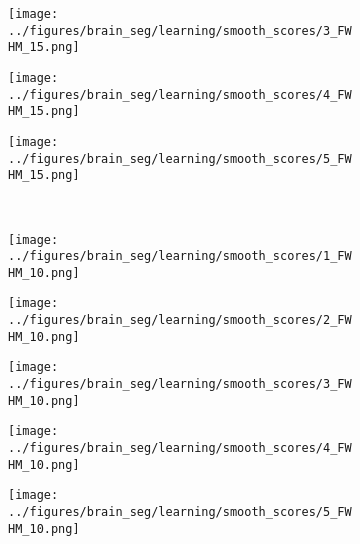 \begin{figure}[h!]
\begin{subfigure}{0.16\textwidth}
		\label{fig:7}
	\end{subfigure}
	\begin{subfigure}{0.16\textwidth}
		\centering
		\texttt{[image: ../figures/brain\_seg/learning/smooth\_scores/3\_FWHM\_15.png]}
		\label{fig:8}
	\end{subfigure}
	\begin{subfigure}{0.16\textwidth}
		\centering
		\texttt{[image: ../figures/brain\_seg/learning/smooth\_scores/4\_FWHM\_15.png]}
		\label{fig:9}
	\end{subfigure}
	\begin{subfigure}{0.16\textwidth}
		\centering
		\texttt{[image: ../figures/brain\_seg/learning/smooth\_scores/5\_FWHM\_15.png]}
		\label{fig:10}
	\end{subfigure}
	\\
	\vspace{-0.35cm}
		\begin{subfigure}[b]{0.03\textwidth} %
		\centering
	\end{subfigure}
	\hspace{0.1cm}
	\begin{subfigure}{0.16\textwidth}
		\centering
		\texttt{[image: ../figures/brain\_seg/learning/smooth\_scores/1\_FWHM\_10.png]}
		\label{fig:6}
	\end{subfigure}
	\begin{subfigure}{0.16\textwidth}
		\centering
		\texttt{[image: ../figures/brain\_seg/learning/smooth\_scores/2\_FWHM\_10.png]}
		\label{fig:7}
	\end{subfigure}
	\begin{subfigure}{0.16\textwidth}
		\centering
		\texttt{[image: ../figures/brain\_seg/learning/smooth\_scores/3\_FWHM\_10.png]}
		\label{fig:8}
	\end{subfigure}
	\begin{subfigure}{0.16\textwidth}
		\centering
		\texttt{[image: ../figures/brain\_seg/learning/smooth\_scores/4\_FWHM\_10.png]}
		\label{fig:9}
	\end{subfigure}
	\begin{subfigure}{0.16\textwidth}
		\centering
		\texttt{[image: ../figures/brain\_seg/learning/smooth\_scores/5\_FWHM\_10.png]}
		\label{fig:10}
	\end{subfigure}
		\\

\end{figure}
